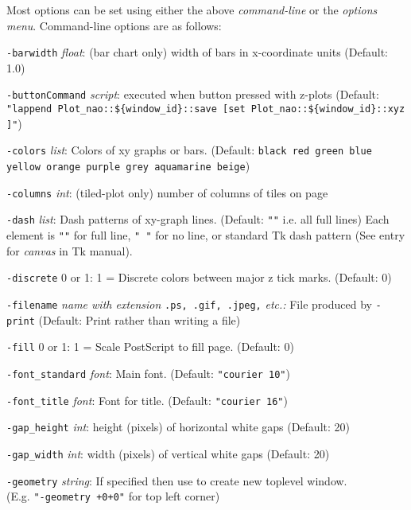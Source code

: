 Most options can be set using either the above 
  \emph{command-line} or the 
  \emph{options menu}.
Command-line options are as follows:
\begin{simpleitems}
  \item
  \texttt{-barwidth} 
  \emph{float}: (bar chart only) width of bars in x-coordinate units
  (Default: 1.0)
  \item
  \texttt{-buttonCommand} 
  \emph{script}: executed when button pressed with z-plots 
    (Default: 
  \\
\texttt{"lappend\ Plot\_nao::\$\{window\_id\}::save\ [set\ Plot\_nao::\$\{window\_id\}::xyz]"})
  \item
  \texttt{-colors} 
  \emph{list}: Colors of xy graphs or bars. (Default: 
  \texttt{black red green blue yellow orange purple grey aquamarine
  beige})
  \item
  \texttt{-columns} 
  \emph{int}: (tiled-plot only) number of columns of tiles on page
  \item
  \texttt{-dash} 
  \emph{list}: Dash patterns of xy-graph lines. (Default: 
  \texttt{""} i.e. all full lines) Each element is 
  \texttt{""} for full line, 
  \texttt{" "} for no line, or standard Tk dash pattern
  (See entry for \emph{canvas} in Tk manual).
  \item
  \texttt{-discrete} 0 or 1: 1 = Discrete colors between major z
  tick marks. (Default: 0)
  \item
  \texttt{-filename} 
  \emph{name with extension} 
  \texttt{.ps, .gif, .jpeg,} 
  \emph{etc.:} File produced by 
  \texttt{-print} (Default: Print rather than writing a file)
  \item
  \texttt{-fill} 0 or 1: 1 = Scale PostScript to fill page.
  (Default: 0)
  \item
  \texttt{-font\_standard} 
  \emph{font}: Main font. (Default: 
  \texttt{"courier 10"})
  \item
  \texttt{-font\_title} 
  \emph{font}: Font for title. (Default: 
  \texttt{"courier 16"})
  \item
  \texttt{-gap\_height} 
  \emph{int}: height (pixels) of horizontal white gaps (Default: 20)
  \item
  \texttt{-gap\_width} 
  \emph{int}: width (pixels) of vertical white gaps (Default: 20)
  \item
  \texttt{-geometry} 
  \emph{string}: If specified then use to create new toplevel window.
  \\
  (E.g. \texttt{"-geometry\ +0+0"} for top left corner)
  \item

\end{simpleitems}
